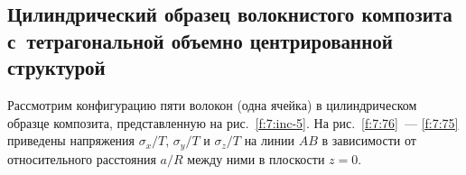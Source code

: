 %

\subsection{Цилиндрический образец волокнистого композита с~тетрагональной объемно центрированной структурой}

Рассмотрим конфигурацию пяти волокон (одна ячейка) в цилиндрическом образце композита, представленную на рис.~\ref{f:7:inc-5}. На рис.~\ref{f:7:76}~--- \ref{f:7:75} приведены напряжения $\sigma_x/T$, $\sigma_y/T$ и $\sigma_z/T$ на линии $AB$ в зависимости от относительного расстояния $a/R$ между ними в плоскости $z=0$.

